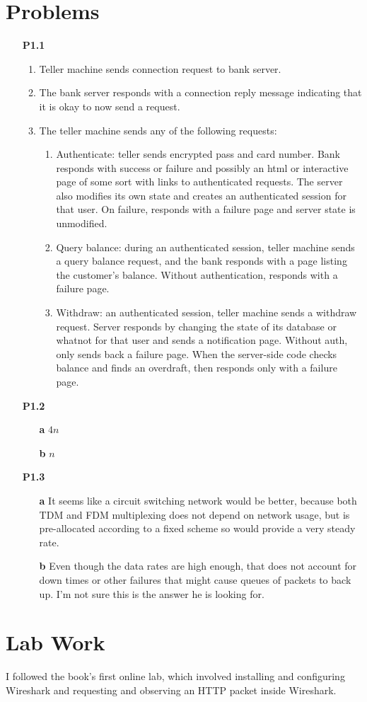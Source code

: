 \documentclass{article}
\begin{document}
\section*{Problems}
\begin{enumerate}
 \item[\textbf{P1.1}]
  \begin{enumerate}
   \item
    Teller machine sends connection request to bank server.
   \item
    The bank server responds with a connection reply message indicating that it
    is okay to now send a request.
   \item
    The teller machine sends any of the following requests:
    \begin{enumerate}
     \item
      Authenticate: teller sends encrypted pass and card number. Bank responds
      with success or failure and possibly an html or interactive page of some
      sort with links to authenticated requests. The server also modifies its
      own state and creates an authenticated session for that user. On failure,
      responds with a failure page and server state is unmodified.
     \item
      Query balance: during an authenticated session, teller machine sends a
      query balance request, and the bank responds with a page listing the
      customer's balance. Without authentication, responds with a failure page.
     \item
      Withdraw: an authenticated session, teller machine sends a withdraw
      request. Server responds by changing the state of its database or whatnot
      for that user and sends a notification page. Without auth, only sends
      back a failure page. When the server-side code checks balance and finds
      an overdraft, then responds only with a failure page.
    \end{enumerate}
  \end{enumerate}
 \item[\textbf{P1.2}]
  \begin{enumerate}
   \item[\textbf{a}]
    $4n$
   \item[\textbf{b}]
    $n$
  \end{enumerate}
 \item[\textbf{P1.3}]
  \begin{enumerate}
   \item[\textbf{a}]
    It seems like a circuit switching network would be better, because both TDM
    and FDM multiplexing does not depend on network usage, but is pre-allocated
    according to a fixed scheme so would provide a very steady rate.
   \item[\textbf{b}]
    Even though the data rates are high enough, that does not account for down
    times or other failures that might cause queues of packets to back up. I'm
    not sure this is the answer he is looking for. 
  \end{enumerate}
  
\end{enumerate}

\section*{Lab Work}
I followed the book's first online lab, which involved installing and
configuring Wireshark and requesting and observing an HTTP packet inside
Wireshark.
\end{document}
